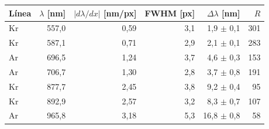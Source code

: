 \begin{tabular}{lrrrrr}
\toprule
Línea & $\lambda$ [nm] & $|d\lambda/dx|$ [nm/px] & FWHM [px] & $\Delta\lambda$ [nm] & $R$ \\
\midrule
Kr & 557{,}0 & 0{,}59 & 3{,}1 & 1{,}9 $\pm$ 0{,}1 & 301 \\
Kr & 587{,}1 & 0{,}71 & 2{,}9 & 2{,}1 $\pm$ 0{,}1 & 283 \\
Ar & 696{,}5 & 1{,}24 & 3{,}7 & 4{,}6 $\pm$ 0{,}3 & 153 \\
Ar & 706{,}7 & 1{,}30 & 2{,}8 & 3{,}7 $\pm$ 0{,}8 & 191 \\
Kr & 877{,}7 & 2{,}45 & 3{,}8 & 9{,}2 $\pm$ 0{,}4 & 95 \\
Kr & 892{,}9 & 2{,}57 & 3{,}2 & 8{,}3 $\pm$ 0{,}7 & 107 \\
Ar & 965{,}8 & 3{,}18 & 5{,}3 & 16{,}8 $\pm$ 0{,}8 & 58 \\
\bottomrule
\end{tabular}
